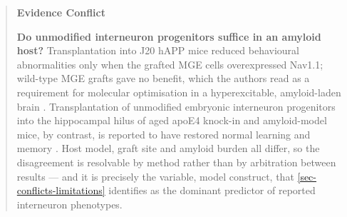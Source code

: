 \documentclass[11pt]{article}
\begin{document}
\begin{quote}
\noindent\textbf{Evidence Conflict}\par
\textbf{Do unmodified interneuron progenitors suffice in an amyloid host?} Transplantation into J20 hAPP mice reduced behavioural abnormalities only when the grafted MGE cells overexpressed Nav1.1; wild-type MGE grafts gave no benefit, which the authors read as a requirement for molecular optimisation in a hyperexcitable, amyloid-laden brain \citep{MartinezLosa2018}. Transplantation of unmodified embryonic interneuron progenitors into the hippocampal hilus of aged apoE4 knock-in and amyloid-model mice, by contrast, is reported to have restored normal learning and memory \citep{Tong2014}. Host model, graft site and amyloid burden all differ, so the disagreement is resolvable by method rather than by arbitration between results --- and it is precisely the variable, model construct, that \ref{sec-conflicts-limitations} identifies as the dominant predictor of reported interneuron phenotypes.

\end{quote}
\end{document}
